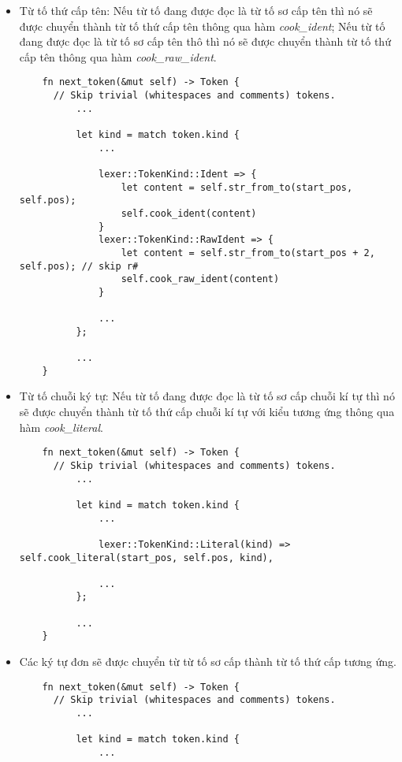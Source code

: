 \begin{itemize}
\begin{lstlisting}
              ...
          };
  
          ...
    }
  \end{lstlisting}
  \item Từ tố thứ cấp tên: Nếu từ tố đang được đọc là từ tố sơ cấp tên thì nó sẽ được chuyển thành từ tố thứ cấp tên thông qua hàm \textit{cook\_ident}; Nếu từ tố đang được đọc là từ tố sơ cấp tên thô thì nó sẽ được chuyển thành từ tố thứ cấp tên thông qua hàm \textit{cook\_raw\_ident}.
  \begin{lstlisting}
    fn next_token(&mut self) -> Token {
      // Skip trivial (whitespaces and comments) tokens.
          ...
  
          let kind = match token.kind {
              ...    
  
              lexer::TokenKind::Ident => {
                  let content = self.str_from_to(start_pos, self.pos);
                  self.cook_ident(content)
              }
              lexer::TokenKind::RawIdent => {
                  let content = self.str_from_to(start_pos + 2, self.pos); // skip r#
                  self.cook_raw_ident(content)
              }
              
              ...
          };
  
          ...
    }
  \end{lstlisting}
  \item Từ tố chuỗi ký tự: Nếu từ tố đang được đọc là từ tố sơ cấp chuỗi kí tự thì nó sẽ được chuyển thành từ tố thứ cấp chuỗi kí tự với kiểu tương ứng thông qua hàm \textit{cook\_literal}.
  \begin{lstlisting}
    fn next_token(&mut self) -> Token {
      // Skip trivial (whitespaces and comments) tokens.
          ...
  
          let kind = match token.kind {
              ...    
  
              lexer::TokenKind::Literal(kind) => self.cook_literal(start_pos, self.pos, kind),
  
              ...
          };
  
          ...
    }
  \end{lstlisting}
  \item Các ký tự đơn sẽ được chuyển từ từ tố sơ cấp thành từ tố thứ cấp tương ứng.
  \begin{lstlisting}
    fn next_token(&mut self) -> Token {
      // Skip trivial (whitespaces and comments) tokens.
          ...
  
          let kind = match token.kind {
              ...    
  

\end{lstlisting}
\end{itemize}
